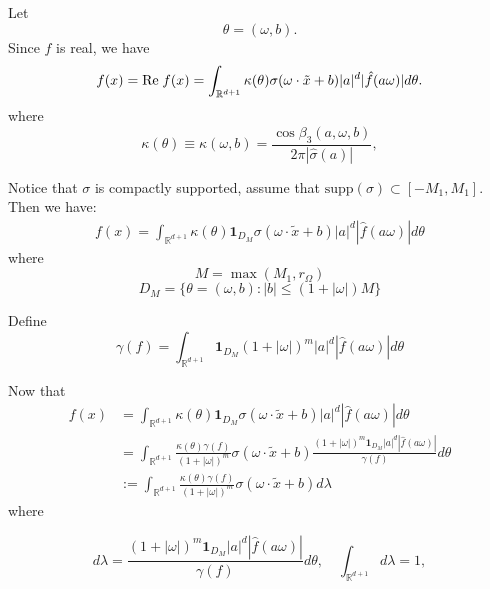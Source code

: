 Let
$$
\theta=(\omega, b).
$$
Since $f$ is real, we have
$$
f(x)={\rm Re}\; f(x) 
=\int_{\mathbb{R}^{d+1}}\kappa(\theta)\sigma(\omega\cdot\tilde x+b )|a|^d|\hat{f}(a\omega)|d\theta.
$$
where
\begin{equation}
\kappa(\theta)\equiv
\kappa(\omega,b)=\frac{\cos\beta_3(a,\omega,b)}{2\pi|\hat{\sigma}(a)|},
\end{equation}



Notice that $\sigma$ is compactly supported, assume that $\mathrm{supp}(\sigma)\subset[-M_1,M_1]$. Then we have:
\begin{equation}
\begin{aligned}
f(x) =\int_{\mathbb{R}^{d+1}}\kappa(\theta)\mathbf{1}_{D_M}\sigma(\omega\cdot \tilde{x}+b)|a|^d|\hat{f}(a\omega)|d\theta 
\end{aligned}
\end{equation}
where
\begin{equation}
M=\max(M_1,r_\Omega)
\end{equation}
\begin{equation}
D_M=\{\theta=(\omega,b):|b|\le(1+|\omega|)M  \}
\end{equation}

Define 
\begin{equation}
\gamma(f)=\int_{\mathbb{R}^{d+1}}\mathbf{1}_{D_M}(1+|\omega|)^m|a|^d|\hat{f}(a\omega)|d\theta 
\end{equation}

Now that
\begin{equation}
\begin{aligned}
f(x) 	&=\int_{\mathbb{R}^{d+1}}\kappa(\theta)\mathbf{1}_{D_M}\sigma(\omega\cdot \tilde{x}+b)|a|^d|\hat{f}(a\omega)|d\theta \\
&= \int_{\mathbb{R}^{d+1}}\frac{\kappa(\theta)\gamma(f)}{(1+|\omega|)^m}\sigma(\omega\cdot \tilde{x}+b)\frac{(1+|\omega|)^m\mathbf{1}_{D_M}|a|^d|\hat{f}(a\omega)|}{\gamma(f)}d\theta\\
&:=\int_{\mathbb{R}^{d+1}}\frac{\kappa(\theta)\gamma(f)}{(1+|\omega|)^m}\sigma(\omega\cdot \tilde{x}+b) d\lambda
\end{aligned}
\end{equation}
where

$$
d\lambda= \frac{(1+|\omega|)^m\mathbf{1}_{D_M}|a|^d|\hat{f}(a\omega)|}{\gamma(f)}d\theta ,\quad \int_{\mathbb{R}^{d+1}}d\lambda=1,
$$

